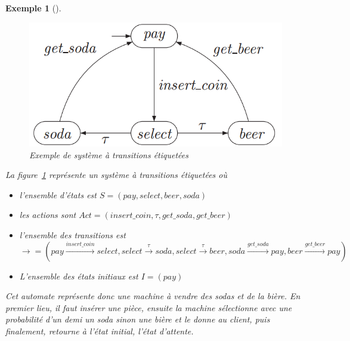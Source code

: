 \documentclass[11pt,a4paper,oneside]{book}
\theoremstyle{break}
\newtheorem{exem}{Exemple}
\theoremstyle{breakplain}
\begin{document}
\begin{exem}[\cite{baier2008principles}]
$\quad$
\begin{figure}[h]
\begin{center}
\includegraphics[scale=0.5]{images/exemplts.png}
\caption{Exemple de système à transitions étiquetées \cite{baier2008principles}}
\label{exemplts}
\end{center}
\end{figure}

La figure~\ref{exemplts} représente un système à transitions étiquetées où
\begin{itemize}
\item l'ensemble d'états est $S = (pay, select, beer, soda)$
\item les actions sont $Act = (insert\_coin, \tau, get\_soda, get\_beer)$
\item l'ensemble des transitions est $\rightarrow = (pay\xrightarrow{insert\_coin}{}select, select\xrightarrow{\tau}{}soda, select\xrightarrow{\tau}{}beer, soda\xrightarrow{get\_soda}{}pay, beer\xrightarrow{get\_beer}{}pay)$
\item L'ensemble des états initiaux est $I = (pay)$
\end{itemize}
Cet automate représente donc une machine à vendre des sodas et de la bière. En premier lieu, il faut insérer une pièce, ensuite la machine sélectionne avec une probabilité d’un demi un soda sinon une bière et le donne au client, puis finalement, retourne à l'état initial, l'état d'attente.


\end{exem}
\end{document}
